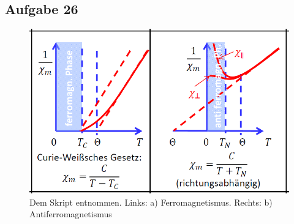 \subsection*{Aufgabe 26}
\begin{figure}[h!]
  \centering
  \includegraphics[width=18cm]{./aufgabe26.png}
  \caption{Dem Skript entnommen. Links: a) Ferromagnetismus. Rechts: b) Antiferromagnetismus}
\end{figure}


